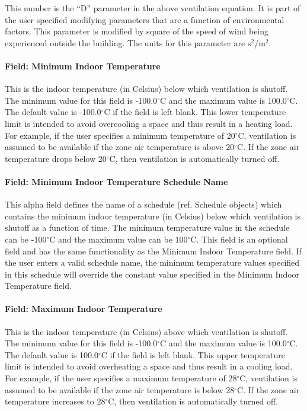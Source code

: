 This number is the ``D'' parameter in the above ventilation equation. It is part of the user specified modifying parameters that are a function of environmental factors. This parameter is modified by square of the speed of wind being experienced outside the building. The units for this parameter are s\(^{2}\)/m\(^{2}\).

\paragraph{Field: Minimum Indoor Temperature}\label{field-minimum-indoor-temperature}

This is the indoor temperature (in Celsius) below which ventilation is shutoff. The minimum value for this field is -100.0$^\circ$C and the maximum value is 100.0$^\circ$C. The default value is -100.0$^\circ$C if the field is left blank. This lower temperature limit is intended to avoid overcooling a space and thus result in a heating load. For example, if the user specifies a minimum temperature of 20$^\circ$C, ventilation is assumed to be available if the zone air temperature is above 20$^\circ$C. If the zone air temperature drops below 20$^\circ$C, then ventilation is automatically turned off.

\paragraph{Field: Minimum Indoor Temperature Schedule Name}\label{field-minimum-indoor-temperature-schedule-name}

This alpha field defines the name of a schedule (ref. Schedule objects) which contains the minimum indoor temperature (in Celsius) below which ventilation is shutoff as a function of time. The minimum temperature value in the schedule can be -100$^\circ$C and the maximum value can be 100$^\circ$C. This field is an optional field and has the same functionality as the Minimum Indoor Temperature field. If the user enters a valid schedule name, the minimum temperature values specified in this schedule will override the constant value specified in the Minimum Indoor Temperature field.

\paragraph{Field: Maximum Indoor Temperature}\label{field-maximum-indoor-temperature}

This is the indoor temperature (in Celsius) above which ventilation is shutoff. The minimum value for this field is -100.0$^\circ$C and the maximum value is 100.0$^\circ$C. The default value is 100.0$^\circ$C if the field is left blank. This upper temperature limit is intended to avoid overheating a space and thus result in a cooling load. For example, if the user specifies a maximum temperature of 28$^\circ$C, ventilation is assumed to be available if the zone air temperature is below 28$^\circ$C. If the zone air temperature increases to 28$^\circ$C, then ventilation is automatically turned off.

